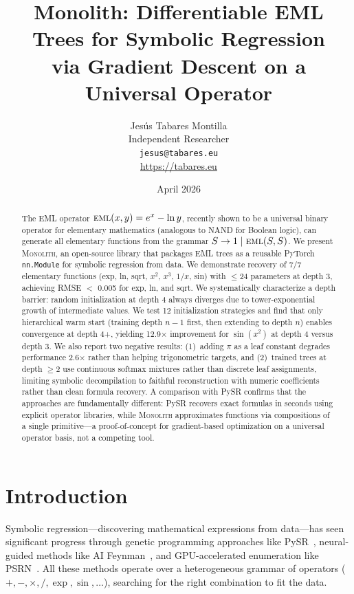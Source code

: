 \documentclass[11pt,a4paper]{article}
\title{Monolith: Differentiable EML Trees for Symbolic Regression\\via Gradient Descent on a Universal Operator}
\author{Jes\'us Tabares Montilla\\
Independent Researcher\\
\texttt{jesus@tabares.eu}\\
\url{https://tabares.eu}}
\date{April 2026}
\newcommand{\eml}{\textsc{eml}}
\newcommand{\monolith}{\textsc{Monolith}}
\begin{document}
\maketitle

\begin{abstract}
The EML operator $\eml(x, y) = e^x - \ln y$, recently shown to be a universal binary operator for elementary mathematics (analogous to NAND for Boolean logic), can generate all elementary functions from the grammar $S \to 1 \mid \eml(S, S)$.
We present \monolith, an open-source library that packages EML trees as a reusable PyTorch \texttt{nn.Module} for symbolic regression from data.
We demonstrate recovery of 7/7 elementary functions (exp, ln, sqrt, $x^2$, $x^3$, $1/x$, sin) with $\leq$24 parameters at depth 3, achieving RMSE $<$ 0.005 for exp, ln, and sqrt.
We systematically characterize a depth barrier: random initialization at depth 4 always diverges due to tower-exponential growth of intermediate values.
We test 12 initialization strategies and find that only hierarchical warm start (training depth $n-1$ first, then extending to depth $n$) enables convergence at depth 4+, yielding 12.9$\times$ improvement for $\sin(x^2)$ at depth 4 versus depth 3.
We also report two negative results: (1)~adding $\pi$ as a leaf constant degrades performance 2.6$\times$ rather than helping trigonometric targets, and (2)~trained trees at depth $\geq 2$ use continuous softmax mixtures rather than discrete leaf assignments, limiting symbolic decompilation to faithful reconstruction with numeric coefficients rather than clean formula recovery.
A comparison with PySR confirms that the approaches are fundamentally different: PySR recovers exact formulas in seconds using explicit operator libraries, while \monolith{} approximates functions via compositions of a single primitive---a proof-of-concept for gradient-based optimization on a universal operator basis, not a competing tool.
\end{abstract}

\section{Introduction}
\label{sec:intro}

Symbolic regression---discovering mathematical expressions from data---has seen significant progress through genetic programming approaches like PySR~\citep{cranmer2023pysr}, neural-guided methods like AI Feynman~\citep{udrescu2020aifeynman}, and GPU-accelerated enumeration like PSRN~\citep{ruan2026psrn}.
All these methods operate over a heterogeneous grammar of operators ($+, -, \times, /, \exp, \sin, \ldots$), searching for the right combination to fit the data.
\end{document}

